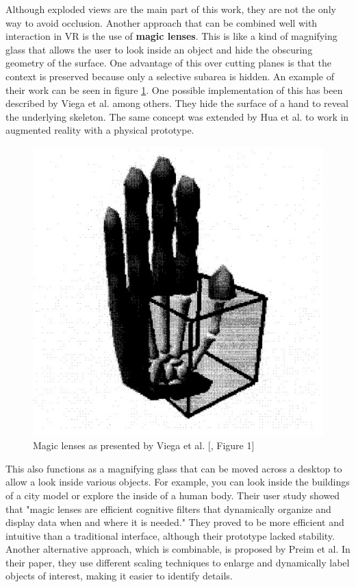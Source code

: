 Although exploded views are the main part of this work, they are not the only way to avoid occlusion. 
Another approach that can be combined well with interaction in VR is the use of \textbf{magic lenses}.
This is like a kind of magnifying glass that allows the user to look inside an object and hide the obscuring geometry of the surface.
One advantage of this over cutting planes is that the context is preserved because only a selective subarea is hidden.   
An example of their work can be seen in figure \ref{fig:viega_hand}.
One possible implementation of this has been described by Viega et al. among others.\cite{Viega_1996}
They hide the surface of a hand to reveal the underlying skeleton.
The same concept was extended by Hua et al. to work in augmented reality with a physical prototype.\cite{Hua_2006}
\begin{figure}
	\centering
	\vspace{-0.4cm}
	\includegraphics[width=1\linewidth]{fig/Images/Viega_fig1}
	\caption[]{Magic lenses as presented by Viega et al. [\cite{Viega_1996}, Figure 1]}
	\label{fig:viega_hand}
	\vspace{-0.1cm}
\end{figure}
This also functions as a magnifying glass that can be moved across a desktop to allow a look inside various objects.
For example, you can look inside the buildings of a city model or explore the inside of a human body.
Their user study showed that "magic lenses are efficient cognitive filters that dynamically organize and display data when and where it is needed."\cite{Hua_2006}
They proved to be more efficient and intuitive than a traditional interface, although their prototype lacked stability.
Another alternative approach, which is combinable, is proposed by Preim et al.\cite{Preim_1997} In their paper, they use different scaling techniques to enlarge and dynamically label objects of interest, making it easier to identify details.

